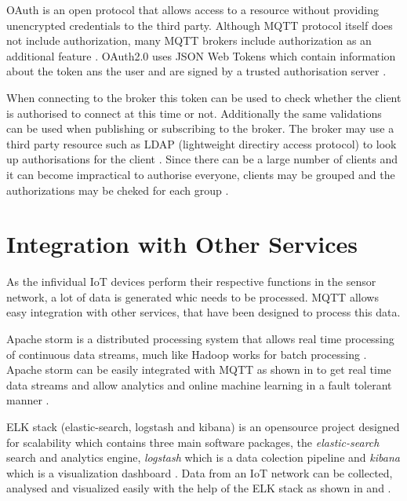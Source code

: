 \documentclass[sigconf]{acmart}
\begin{document}
OAuth is an open protocol that allows access to a resource without
providing unencrypted credentials to the third party. Although MQTT
protocol itself does not include authorization, many MQTT brokers
include authorization as an additional feature
\cite{ibm-mqtt-security}. OAuth2.0 uses JSON Web Tokens which contain
information about the token ans the user and are signed by a trusted
authorisation server \cite{hivemq-security-oauth}.

When connecting to the broker this token can be used to check whether
the client is authorised to connect at this time or not. Additionally
the same validations can be used when publishing or subscribing to the
broker. The broker may use a third party resource such as LDAP
(lightweight directiry access protocol) to look up authorisations for
the client \cite{hivemq-security-oauth}. Since there can be a large
number of clients and it can become impractical to authorise everyone,
clients may be grouped and the authorizations may be cheked for each
group \cite{ibm-mqtt-security}.
  
\section{Integration with Other Services}

As the infividual IoT devices perform their respective functions in
the sensor network, a lot of data is generated whic needs to be
processed. MQTT allows easy integration with other services, that have
been designed to process this data.

Apache storm is a distributed processing system that allows real time
processing of continuous data streams, much like Hadoop works for
batch processing \cite{apache-storm}. Apache storm can be easily
integrated with MQTT as shown in \cite{apache-storm-mqtt} to get real
time data streams and allow analytics and online machine learning in a
fault tolerant manner \citep{apache-storm-wiki}.

ELK stack (elastic-search, logstash and kibana) is an opensource
project designed for scalability which contains three main software
packages, the {\em elastic-search} search and analytics engine, {\em
  logstash} which is a data colection pipeline and {\em kibana} which
is a visualization dashboard \cite{elk-stack}. Data from an IoT
network can be collected, analysed and visualized easily with the help
of the ELK stack as shown in \cite{mqtt-elasticsearch-setup} and
\cite{kibana-mqtt-analysis}.
\end{document}
